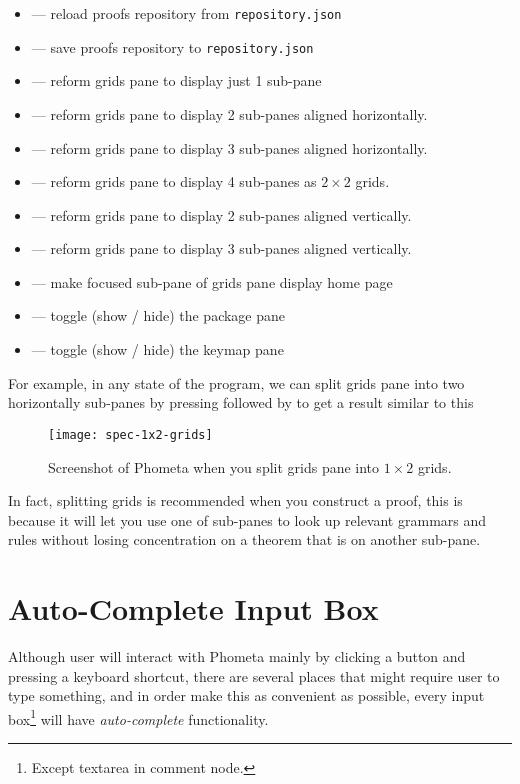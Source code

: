 \documentclass[master.tex]{subfiles}
\begin{document}
\begin{itemize}
\item {} --- reload proofs repository from \texttt{repository.json}
\item {} --- save proofs repository to \texttt{repository.json}
\item {} --- reform grids pane to display just 1 sub-pane
\item {} --- reform grids pane to display 2 sub-panes aligned
  horizontally.
\item {} --- reform grids pane to display 3 sub-panes aligned
  horizontally.
\item {} --- reform grids pane to display 4 sub-panes as $2 \times 2$
  grids.
\item {} --- reform grids pane to display 2 sub-panes aligned
  vertically.
\item {} --- reform grids pane to display 3 sub-panes aligned
  vertically.
\item {} --- make focused sub-pane of grids pane display home page
\item {} --- toggle (show / hide) the package pane
\item {} --- toggle (show / hide) the keymap pane
\end{itemize}

For example, in any state of the program, we can split grids pane into two
horizontally sub-panes by pressing  followed by  to get a
result similar to this

\begin{figure}[H]
    \centering
    \texttt{[image: spec-1x2-grids]}
    \caption{Screenshot of Phometa when you split grids pane into $1 \times 2$
      grids.}
\label{fig:specification-1x2-grids}
\end{figure}

In fact, splitting grids is recommended when you construct a proof, this is
because it will let you use one of sub-panes to look up relevant grammars and
rules without losing concentration on a theorem that is on another sub-pane.

\section{Auto-Complete Input Box}
Although user will interact with Phometa mainly by clicking a button and
pressing a keyboard shortcut, there are several places that might require user
to type something, and in order make this as convenient as possible, every input
box\footnote{Except textarea in comment node.} will have \emph{auto-complete}
functionality.
\end{document}
